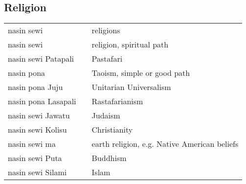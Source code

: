 \subsection{Religion}
%
\begin{supertabular}{p{4,5cm}|ll}
    nasin sewi          &  & religions                                    \\
    nasin sewi          &  & religion, spiritual path                     \\
    nasin sewi Patapali &  & Pastafari                                    \\
    nasin pona          &  & Taoism, simple or good path                  \\
    nasin pona Juju     &  & Unitarian Universalism                       \\
    nasin pona Lasapali &  & Rastafarianism                               \\
    nasin sewi Jawatu   &  & Judaism                                      \\
    nasin sewi Kolisu   &  & Christianity                                 \\
    nasin sewi ma       &  & earth religion, e.g. Native American beliefs \\
    nasin sewi Puta     &  & Buddhism                                     \\
    nasin sewi Silami   &  & Islam                                        \\
\end{supertabular} \\
%
%
